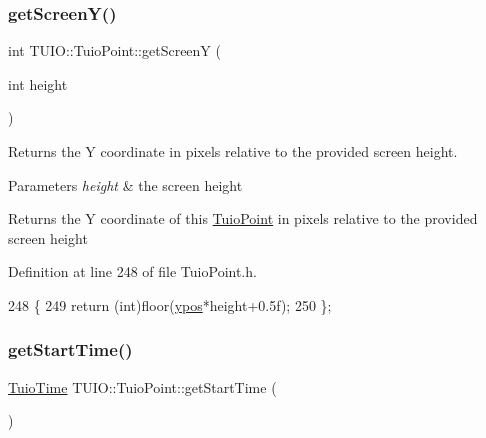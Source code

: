 \subsubsection{\texorpdfstring{get\+Screen\+Y()}{getScreenY()}}
{\footnotesize\ttfamily int T\+U\+I\+O\+::\+Tuio\+Point\+::get\+ScreenY (\begin{DoxyParamCaption}\item[{int}]{height }\end{DoxyParamCaption})\hspace{0.3cm}{\ttfamily [inline]}}

Returns the Y coordinate in pixels relative to the provided screen height.


\begin{DoxyParams}{Parameters}
{\em height} & the screen height \\
\hline
\end{DoxyParams}
\begin{DoxyReturn}{Returns}
the Y coordinate of this \hyperlink{class_t_u_i_o_1_1_tuio_point}{Tuio\+Point} in pixels relative to the provided screen height 
\end{DoxyReturn}


Definition at line 248 of file Tuio\+Point.\+h.


\begin{DoxyCode}
248                                    \{
249             \textcolor{keywordflow}{return} (\textcolor{keywordtype}{int})floor(\hyperlink{class_t_u_i_o_1_1_tuio_point_a89a038775a681166168735dbc95c7779}{ypos}*height+0.5f);
250         \};
\end{DoxyCode}
\mbox{\label{class_t_u_i_o_1_1_tuio_point_a8fc2e5a2536990cce218c8252b757aa0}} 
\subsubsection{\texorpdfstring{get\+Start\+Time()}{getStartTime()}}
{\footnotesize\ttfamily \hyperlink{class_t_u_i_o_1_1_tuio_time}{Tuio\+Time} T\+U\+I\+O\+::\+Tuio\+Point\+::get\+Start\+Time (\begin{DoxyParamCaption}{ }\end{DoxyParamCaption})\hspace{0.3cm}{\ttfamily [inline]}}

